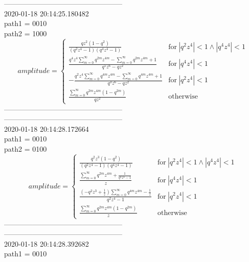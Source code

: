 \documentclass{jsreport}
\begin{document}
--------------------------------------------------\\
2020-01-18 20:14:25.180482\\
path1 = 0010\\
path2 = 1000\\
$$amplitude = \begin{cases} \frac{q z^{2} \left(1 - q^{2}\right)}{\left(q^{2} z^{4} - 1\right) \left(q^{4} z^{4} - 1\right)} & \text{for}\: \left|{q^{2} z^{4}}\right| < 1 \wedge \left|{q^{4} z^{4}}\right| < 1 \\\frac{q^{4} z^{4} \sum_{m=0}^{\infty} q^{2 m} z^{4 m} - \sum_{m=0}^{\infty} q^{2 m} z^{4 m} + 1}{q^{5} z^{6} - q z^{2}} & \text{for}\: \left|{q^{4} z^{4}}\right| < 1 \\- \frac{q^{2} z^{4} \sum_{m=0}^{\infty} q^{4 m} z^{4 m} - \sum_{m=0}^{\infty} q^{4 m} z^{4 m} + 1}{q^{3} z^{6} - q z^{2}} & \text{for}\: \left|{q^{2} z^{4}}\right| < 1 \\\frac{\sum_{m=0}^{\infty} q^{2 m} z^{4 m} \left(1 - q^{2 m}\right)}{q z^{2}} & \text{otherwise} \end{cases}$$
--------------------------------------------------\\
--------------------------------------------------\\
2020-01-18 20:14:28.172664\\
path1 = 0010\\
path2 = 0100\\
$$amplitude = \begin{cases} \frac{q^{2} z^{3} \left(1 - q^{2}\right)}{\left(q^{2} z^{4} - 1\right) \left(q^{4} z^{4} - 1\right)} & \text{for}\: \left|{q^{2} z^{4}}\right| < 1 \wedge \left|{q^{4} z^{4}}\right| < 1 \\\frac{\sum_{m=0}^{\infty} q^{2 m} z^{4 m} + \frac{1}{q^{4} z^{4} - 1}}{z} & \text{for}\: \left|{q^{4} z^{4}}\right| < 1 \\\frac{\left(- q^{2} z^{3} + \frac{1}{z}\right) \sum_{m=0}^{\infty} q^{4 m} z^{4 m} - \frac{1}{z}}{q^{2} z^{4} - 1} & \text{for}\: \left|{q^{2} z^{4}}\right| < 1 \\\frac{\sum_{m=0}^{\infty} q^{2 m} z^{4 m} \left(1 - q^{2 m}\right)}{z} & \text{otherwise} \end{cases}$$
--------------------------------------------------\\
--------------------------------------------------\\
2020-01-18 20:14:28.392682\\
path1 = 0010\\
\end{document}
